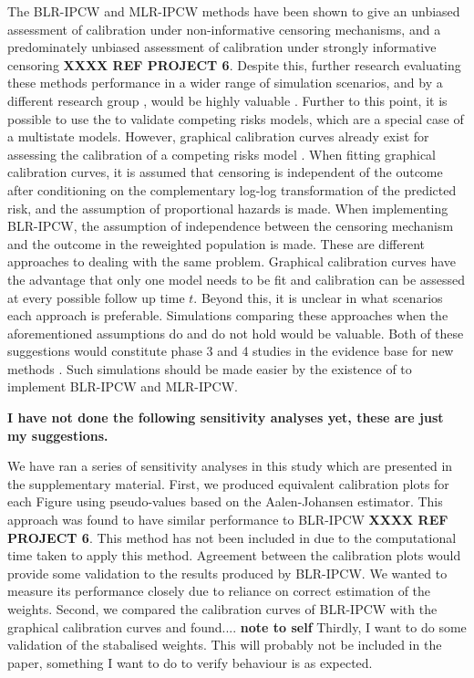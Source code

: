 \documentclass[nojss]{jss}
\begin{document}
The BLR-IPCW and MLR-IPCW methods have been shown to give an unbiased assessment of calibration under non-informative censoring mechanisms, and a predominately unbiased assessment of calibration under strongly informative censoring \textbf{XXXX REF PROJECT 6}. Despite this, further research evaluating these methods performance in a wider range of simulation scenarios, and by a different research group \citep{Boulesteix2013}, would be highly valuable \citep{Heinze2022}. Further to this point, it is possible to use the  to validate competing risks models, which are a special case of a multistate models. However, graphical calibration curves already exist for assessing the calibration of a competing risks model \citep{Austin2022}. When fitting graphical calibration curves, it is assumed that censoring is independent of the outcome after conditioning on the complementary log-log transformation of the predicted risk, and the assumption of proportional hazards is made. When implementing BLR-IPCW, the assumption of independence between the censoring mechanism and the outcome in the reweighted population is made. These are different approaches to dealing with the same problem. Graphical calibration curves have the advantage that only one model needs to be fit and calibration can be assessed at every possible follow up time $t$. Beyond this, it is unclear in what scenarios each approach is preferable. Simulations comparing these approaches when the aforementioned assumptions do and do not hold would be valuable. Both of these suggestions would constitute phase 3 and 4 studies in the evidence base for new methods \citep{Heinze2022}. Such simulations should be made easier by the existence of  to implement BLR-IPCW and MLR-IPCW.

\textbf{I have not done the following sensitivity analyses yet, these are just my suggestions.}

We have ran a series of sensitivity analyses in this study which are presented in the supplementary material. First, we produced equivalent calibration plots for each Figure using pseudo-values based on the Aalen-Johansen estimator. This approach was found to have similar performance to BLR-IPCW \textbf{XXXX REF PROJECT 6}. This method has not been included in  due to the computational time taken to apply this method. Agreement between the calibration plots would provide some validation to the results produced by BLR-IPCW. We wanted to measure its performance closely due to reliance on correct estimation of the weights. Second, we compared the calibration curves of BLR-IPCW with the graphical calibration curves and found.... \textbf{note to self} Thirdly, I want to do some validation of the stabalised weights. This will probably not be included in the paper, something I want to do to verify behaviour is as expected.
\end{document}
